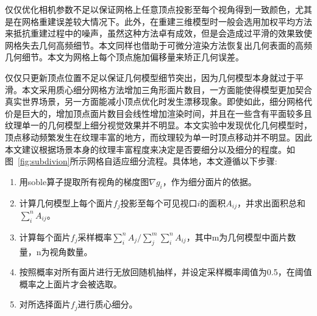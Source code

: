 仅仅优化相机参数不足以保证网格上任意顶点投影至每个视角得到一致颜色，尤其是在网格重建误差较大情况下。此外，在重建三维模型时一般会选用加权平均方法来抵抗重建过程中的噪声，虽然这种方法卓有成效，但是会造成过平滑的效果致使网格失去几何高频细节。本文同样也借助于可微分渲染方法恢复出几何表面的高频几何细节。本文为网格上每个顶点施加偏移量来矫正几何误差。\par
仅仅只更新顶点位置不足以保证几何模型细节突出，因为几何模型本身就过于平滑。本文采用质心细分网格方法增加三角形面片数目，一方面能使得模型更加契合真实世界场景，另一方面能减小顶点优化时发生漂移现象。即使如此，细分网格代价是巨大的，增加顶点面片数目会线性增加渲染时间，并且在一些含有平面较多且纹理单一的几何模型上细分视觉效果并不明显。本文实验中发现优化几何模型时，顶点移动频繁发生在纹理丰富的地方，而纹理较为单一时顶点移动并不明显。因此本文建议根据场景本身的纹理丰富程度来决定是否要细分以及细分的程度。如图~\ref{fig:subdivion}所示网格自适应细分流程。具体地，本文遵循以下步骤:
\begin{enumerate}[label=(\arabic*),leftmargin=\parindent,align=left,labelwidth=\parindent,labelsep=0pt]
	\item 用soble算子提取所有视角的梯度图$\nabla g_i$，作为细分面片的依据。
	\item 计算几何模型上每个面片$f_j$投影至每个可见视口$i$的面积$A_{ij}$，并求出面积总和$\sum_{i}^{n} A_{ij}$。
	\item 计算每个面片$f_j$采样概率$\sum_{i}^{n} A_{j} / \sum_{j}^{m}\sum_{i}^{n} A_{ij}$，其中m为几何模型中面片数量，n为视角数量。
	\item 按照概率对所有面片进行无放回随机抽样，并设定采样概率阈值为0.5，在阈值概率之上面片才会被选取。
	\item 对所选择面片$f_j$进行质心细分。
\end{enumerate}

